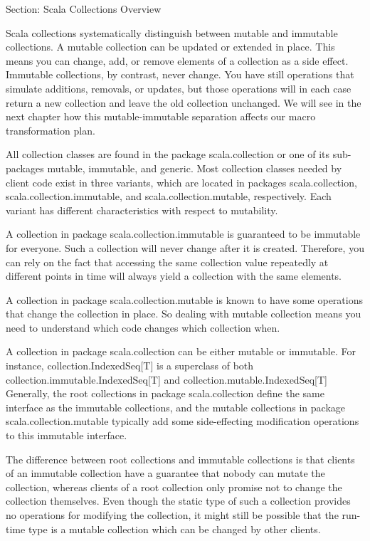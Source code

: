 Section: Scala Collections Overview

Scala collections systematically distinguish between mutable and immutable
collections. A mutable collection can be updated or extended in place. This
means you can change, add, or remove elements of a collection as a side effect.
Immutable collections, by contrast, never change. You have still operations that
simulate additions, removals, or updates, but those operations will in each case
return a new collection and leave the old collection unchanged. We will see in
the next chapter how this mutable-immutable separation affects our macro
transformation plan.

All collection classes are found in the package scala.collection or one of its
sub-packages mutable, immutable, and generic. Most collection classes needed by
client code exist in three variants, which are located in packages
scala.collection, scala.collection.immutable, and scala.collection.mutable,
respectively. Each variant has different characteristics with respect to
mutability.

A collection in package scala.collection.immutable is guaranteed to be immutable
for everyone. Such a collection will never change after it is created.
Therefore, you can rely on the fact that accessing the same collection value
repeatedly at different points in time will always yield a collection with the
same elements.

A collection in package scala.collection.mutable is known to have some
operations that change the collection in place. So dealing with mutable
collection means you need to understand which code changes which collection
when.

A collection in package scala.collection can be either mutable or immutable. For
instance, collection.IndexedSeq[T] is a superclass of both
collection.immutable.IndexedSeq[T] and collection.mutable.IndexedSeq[T]
Generally, the root collections in package scala.collection define the same
interface as the immutable collections, and the mutable collections in package
scala.collection.mutable typically add some side-effecting modification
operations to this immutable interface.

The difference between root collections and immutable collections is that
clients of an immutable collection have a guarantee that nobody can mutate the
collection, whereas clients of a root collection only promise not to change the
collection themselves. Even though the static type of such a collection provides
no operations for modifying the collection, it might still be possible that the
run-time type is a mutable collection which can be changed by other clients.

